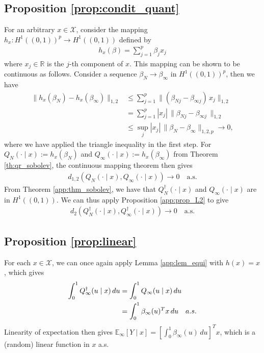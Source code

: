 \documentclass[11pt,a4paper]{article}
\newcommand{\R}{\mathbb{R}}
\newcommand{\E}{\mathbb{E}}
\begin{document}
\begin{appendices}
\subsection{Proposition \ref{prop:condit_quant}}
For an arbitrary $x \in \mathcal{X}$, consider the mapping $h_x: H^1((0,1))^p \to H^1((0,1))$ defined by 
\begin{align*}
h_x(\beta)= \sum_{j = 1}^p \beta_j x_j
\end{align*}
where $x_j\in \R$ is the $j$-th component of $x$. This mapping can be shown to be continuous as follows. Consider a sequence $\beta_N \to \beta_\infty$ in $H^1((0,1))^p$, then we have
\begin{align*}
    \|h_x(\beta_N) - h_x(\beta_\infty)\|_{1,2}      &\leq \sum_{j = 1}^p \|(\beta_{Nj}- \beta_{\infty j}) \, x_j \|_{1,2}\\
    &=\sum_{j = 1}^p |x_j|\, \|\beta_{Nj}- \beta_{\infty j} \, \|_{1,2}\\
    &\leq \sup_{j}|x_j|\, \|\beta_N - \beta_\infty\|_{1,2,p} \to 0,
\end{align*}
where we have applied the triangle inequality in the first step. For $Q_N(\cdot \mid x) := h_x(\beta_N)$ and $Q_\infty(\cdot \mid x) := h_x(\beta_\infty)$ from {Theorem \ref{th:qr_sobolev}}, the continuous mapping theorem then gives
\begin{align*}
    d_{1,2}\left(Q_N(\cdot \mid x), Q_\infty(\cdot \mid x)\right) \to 0 \quad \text{a.s.}
\end{align*}
From {Theorem \ref{app:thm_sobolev}}, we have that  $Q_N^{\dagger}(\cdot \mid x)$ and $Q_\infty(\cdot \mid x)$ are in $H^1((0,1))$. We can thus apply {Proposition \ref{app:prop_L2}} to give 
\begin{align*}
        d_{2}(Q^{\dagger}_N(\cdot \mid x), Q^{\dagger}_\infty(\cdot \mid x)) \to 0 \quad \text{a.s.}
\end{align*}

\subsection{Proposition \ref{prop:linear}}
    For each $x \in \mathcal{X}$,  we can once again apply {Lemma \ref{app:lem_equi}} with $h(x) = x$, which gives
\begin{align*}
\int_0^1 Q^{\dagger}_\infty(u \mid x)\, du&= \int_0^1 Q_\infty(u \mid x)\, du\\
&=\int_0^1 \beta_\infty(u)^T x \, du \quad \textnormal{a.s.}
\end{align*}
Linearity of expectation then gives $\E_\infty\left[Y \mid x\right] = \left[\int_0^1 \beta_\infty(u) \, du \right]^T x$, which is a (random) linear function in $x$ a.s.


\end{appendices}
\end{document}
